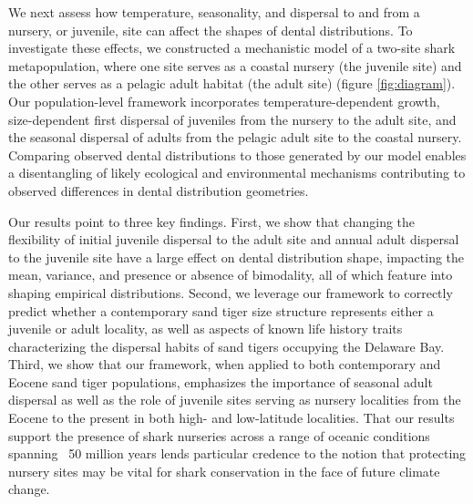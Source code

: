 \documentclass[]{rsos}%
\begin{document}
We next assess how temperature, seasonality, and dispersal to and from a nursery, or juvenile, site can affect the shapes of dental distributions.
To investigate these effects, we constructed a mechanistic model of a two-site shark metapopulation, where one site serves as a coastal nursery (the juvenile site) and the other serves as a pelagic adult habitat (the adult site) (figure \ref{fig:diagram}). 
Our population-level framework incorporates temperature-dependent growth, size-dependent first dispersal of juveniles from the nursery to the adult site, and the seasonal dispersal of adults from the pelagic adult site to the coastal nursery.
Comparing observed dental distributions to those generated by our model enables a disentangling of likely ecological and environmental mechanisms contributing to observed differences in dental distribution geometries.

Our results point to three key findings.
First, we show that changing the flexibility of initial juvenile dispersal to the adult site and annual adult dispersal to the juvenile site have a large effect on dental distribution shape, impacting the mean, variance, and presence or absence of bimodality, all of which feature into shaping empirical distributions.
Second, we leverage our framework to correctly predict whether a contemporary sand tiger size structure represents either a juvenile or adult locality, as well as aspects of known life history traits characterizing the dispersal habits of sand tigers occupying the Delaware Bay.
Third, we show that our framework, when applied to both contemporary and Eocene sand tiger populations, emphasizes the importance of seasonal adult dispersal as well as the role of juvenile sites serving as nursery localities from the Eocene to the present in both high- and low-latitude localities.
That our results support the presence of shark nurseries across a range of oceanic conditions spanning ~50 million years lends particular credence to the notion that protecting nursery sites may be vital for shark conservation in the face of future climate change.


\end{document}
